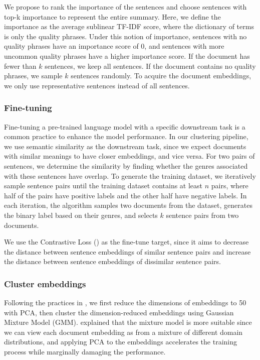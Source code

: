 \documentclass{article}
\begin{document}
\begin{multicols}{2}
We propose to rank the importance of the sentences and choose sentences with top-k importance to represent the entire summary. Here, we define the importance as the average sublinear TF-IDF score, where the dictionary of terms is only the quality phrases. Under this notion of importance, sentences with no quality phrases have an importance score of 0, and sentences with more uncommon quality phrases have a higher importance score. If the document has fewer than $k$ sentences, we keep all sentences. If the document contains no quality phrases, we sample $k$ sentences randomly. To acquire the document embeddings, we only use representative sentences instead of all sentences.

\subsubsection{Fine-tuning}
Fine-tuning a pre-trained language model with a specific downstream task is a common practice to enhance the model performance. In our clustering pipeline, we use semantic similarity as the downstream task, since we expect documents with similar meanings to have closer embeddings, and vice versa. 
For two pairs of sentences, we determine the similarity by finding whether the genres associated with these sentences have overlap. To generate the training dataset, we iteratively sample sentence pairs until the training dataset contains at least $n$ pairs, where half of the pairs have positive labels and the other half have negative labels. In each iteration, the algorithm samples two documents from the dataset, generates the binary label based on their genres, and selects $k$ sentence pairs from two documents.

We use the Contrastive Loss (\cite{1640964}) as the fine-tune target, since it aims to decrease the distance between sentence embeddings of similar sentence pairs and increase the distance between sentence embeddings of dissimilar sentence pairs.


\subsubsection{Cluster embeddings}
Following the practices in \cite{aharoni-goldberg-2020-unsupervised}, we first reduce the dimensions of embeddings to 50 with PCA, then cluster the dimension-reduced embeddings using Gaussian Mixture Model (GMM). \cite{aharoni-goldberg-2020-unsupervised} explained that the mixture model is more suitable since we can view each document embedding as from a mixture of different domain distributions, and applying PCA to the embeddings accelerates the training process while marginally damaging the performance.




\end{multicols}
\end{document}
